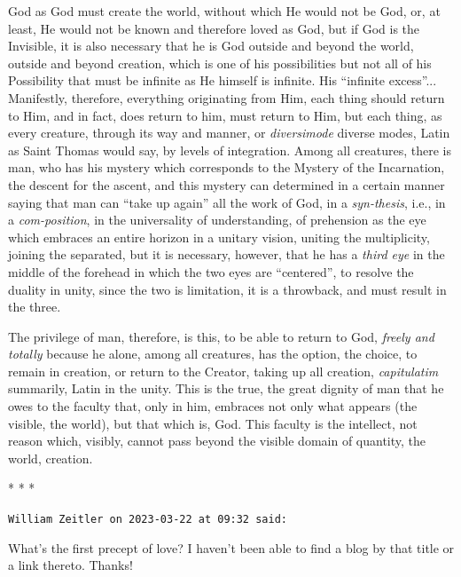 God as God must create the world, without which He would not be God, or, at least, He would not be known and therefore loved as God, but if God is the Invisible, it is also necessary that he is God outside and beyond the world, outside and beyond creation, which is one of his possibilities but not all of his Possibility that must be infinite as He himself is infinite. His ``infinite excess''... Manifestly, therefore, everything originating from Him, each thing should return to Him, and in fact, does return to him, must return to Him, but each thing, as every creature, through its way and manner, or \emph{diversimode} diverse modes, Latin as Saint Thomas would say, by levels of integration. Among all creatures, there is man, who has his mystery which corresponds to the Mystery of the Incarnation, the descent for the ascent, and this mystery can determined in a certain manner saying that man can ``take up again'' all the work of God, in a \emph{syn-thesis}, i.e., in a \emph{com-position}, in the universality of understanding, of prehension as the eye which embraces an entire horizon in a unitary vision, uniting the multiplicity, joining the separated, but it is necessary, however, that he has a \emph{third eye} in the middle of the forehead in which the two eyes are ``centered'', to resolve the duality in unity, since the two is limitation, it is a throwback, and must result in the three.

The privilege of man, therefore, is this, to be able to return to God, \emph{freely and totally} because he alone, among all creatures, has the option, the choice, to remain in creation, or return to the Creator, taking up all creation, \emph{capitulatim} summarily, Latin in the unity. This is the true, the great dignity of man that he owes to the faculty that, only in him, embraces not only what appears (the visible, the world), but that which is, God. This faculty is the intellect, not reason which, visibly, cannot pass beyond the visible domain of quantity, the world, creation.



\begin{center}* * *\end{center}

\begin{footnotesize}
\begin{sffamily}
\texttt{William Zeitler on 2023-03-22 at 09:32 said:}

What's the first precept of love? I haven't been able to find a blog by that title or a link thereto. Thanks!


\hfill

\end{sffamily}
\end{footnotesize}

